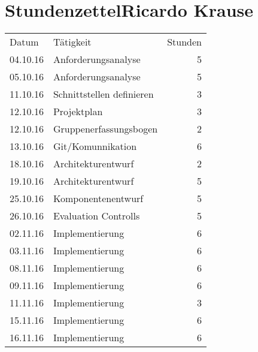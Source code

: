 \chapter{StundenzettelRicardo Krause}
\begin{minipage}{0.5\textwidth}
    \begin{tabular}{llr}
       Datum& Tätigkeit&Stunden\\
       
       04.10.16&Anforderungsanalyse&5 \\
       05.10.16&Anforderungsanalyse&5 \\
       11.10.16&Schnittstellen definieren&3 \\
       12.10.16&Projektplan&3 \\
       12.10.16&Gruppenerfassungsbogen&2\\
       13.10.16&Git/Komunnikation &6\\
       18.10.16&Architekturentwurf&2 \\
       19.10.16&Architekturentwurf&5 \\
       25.10.16&Komponentenentwurf&5 \\
       26.10.16&Evaluation Controlls&5 \\
       02.11.16&Implementierung&6 \\
       03.11.16&Implementierung&6 \\
       08.11.16&Implementierung&6 \\
       09.11.16&Implementierung&6 \\
       11.11.16&Implementierung&3 \\
       15.11.16&Implementierung&6 \\
       16.11.16&Implementierung&6 \\



    \end{tabular}
\end{minipage}
